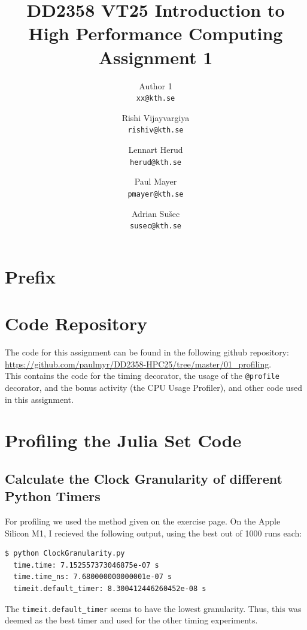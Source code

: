 \documentclass[a4paper,12pt]{article}
\title{
  \normalsize{DD2358 VT25 Introduction to}\\
  \normalsize{High Performance Computing}\\
  \large{Assignment 1}\\
}
\author{
  \small Author 1\\[-0.75ex]
  \scriptsize\texttt{xx@kth.se}
  \and
  \small Rishi Vijayvargiya\\[-0.75ex]
  \scriptsize\texttt{rishiv@kth.se}
  \and
  \small Lennart Herud\\[-0.75ex]
  \scriptsize\texttt{herud@kth.se}
  \and
  \small Paul Mayer\\[-0.75ex]
  \scriptsize\texttt{pmayer@kth.se}
  \and
  \small Adrian Sušec\\[-0.75ex]
  \scriptsize\texttt{susec@kth.se}
}
\date{}
\begin{document}
\maketitle
\thispagestyle{firstpagestyle}

\listoftodos

\vspace{1em}

%
\section*{Prefix}

%

\section{Code Repository}
The code for this assignment can be found in the following github repository: \url{https://github.com/paulmyr/DD2358-HPC25/tree/master/01_profiling}. \\

This contains the code for the timing decorator, the usage of the \verb|@profile| decorator, and the bonus activity (the CPU Usage Profiler), and other code used in this assignment.

\section{Profiling the Julia Set Code}
\subsection{Calculate the Clock Granularity of different Python Timers}
For profiling we used the method given on the exercise page.
On the Apple Silicon M1, I recieved the following output, using the best out of 1000 runs each:
\begin{lstlisting}[language=bash,basicstyle=\ttfamily]
  $ python ClockGranularity.py
  time.time: 7.152557373046875e-07 s
  time.time_ns: 7.680000000000001e-07 s
  timeit.default_timer: 8.300412446260452e-08 s
\end{lstlisting}
The \verb|timeit.default_timer| seems to have the lowest granularity. Thus, this was deemed as the best timer and used for the other timing experiments. 
\end{document}

